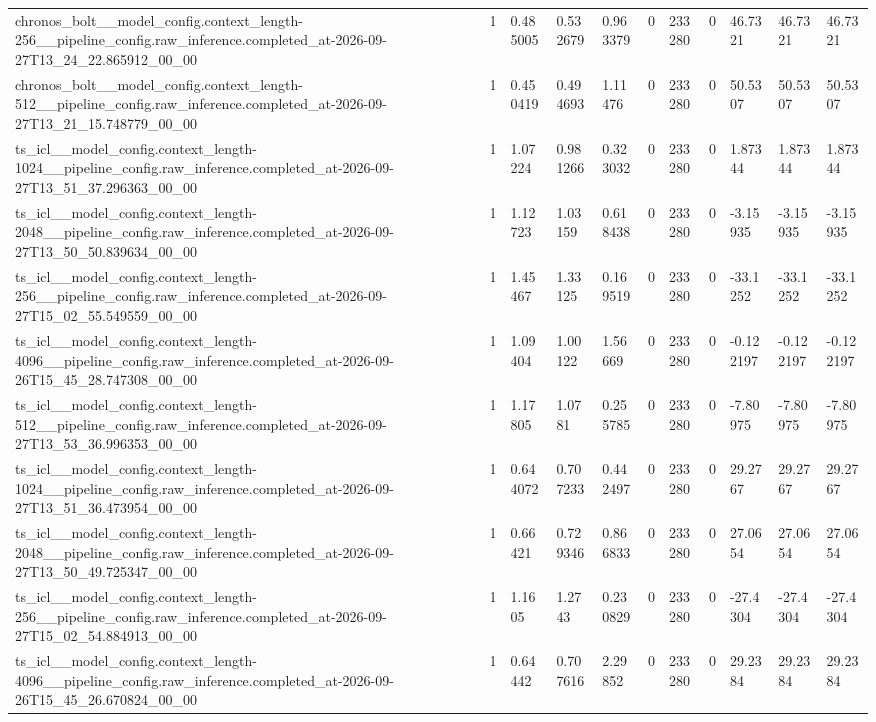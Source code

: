 \begin{tabular}{lllllllllll}
chronos\_bolt\_\_model\_config.context\_length-256\_\_pipeline\_config.raw\_inference.completed\_at-2026-09-27T13\_24\_22.865912\_00\_00 & 1 & 0.485005 & 0.532679 & 0.963379 & 0 & 233280 & 0 & 46.7321 & 46.7321 & 46.7321 \\
chronos\_bolt\_\_model\_config.context\_length-512\_\_pipeline\_config.raw\_inference.completed\_at-2026-09-27T13\_21\_15.748779\_00\_00 & 1 & 0.450419 & 0.494693 & 1.11476 & 0 & 233280 & 0 & 50.5307 & 50.5307 & 50.5307 \\
ts\_icl\_\_model\_config.context\_length-1024\_\_pipeline\_config.raw\_inference.completed\_at-2026-09-27T13\_51\_37.296363\_00\_00 & 1 & 1.07224 & 0.981266 & 0.323032 & 0 & 233280 & 0 & 1.87344 & 1.87344 & 1.87344 \\
ts\_icl\_\_model\_config.context\_length-2048\_\_pipeline\_config.raw\_inference.completed\_at-2026-09-27T13\_50\_50.839634\_00\_00 & 1 & 1.12723 & 1.03159 & 0.618438 & 0 & 233280 & 0 & -3.15935 & -3.15935 & -3.15935 \\
ts\_icl\_\_model\_config.context\_length-256\_\_pipeline\_config.raw\_inference.completed\_at-2026-09-27T15\_02\_55.549559\_00\_00 & 1 & 1.45467 & 1.33125 & 0.169519 & 0 & 233280 & 0 & -33.1252 & -33.1252 & -33.1252 \\
ts\_icl\_\_model\_config.context\_length-4096\_\_pipeline\_config.raw\_inference.completed\_at-2026-09-26T15\_45\_28.747308\_00\_00 & 1 & 1.09404 & 1.00122 & 1.56669 & 0 & 233280 & 0 & -0.122197 & -0.122197 & -0.122197 \\
ts\_icl\_\_model\_config.context\_length-512\_\_pipeline\_config.raw\_inference.completed\_at-2026-09-27T13\_53\_36.996353\_00\_00 & 1 & 1.17805 & 1.0781 & 0.255785 & 0 & 233280 & 0 & -7.80975 & -7.80975 & -7.80975 \\
ts\_icl\_\_model\_config.context\_length-1024\_\_pipeline\_config.raw\_inference.completed\_at-2026-09-27T13\_51\_36.473954\_00\_00 & 1 & 0.644072 & 0.707233 & 0.442497 & 0 & 233280 & 0 & 29.2767 & 29.2767 & 29.2767 \\
ts\_icl\_\_model\_config.context\_length-2048\_\_pipeline\_config.raw\_inference.completed\_at-2026-09-27T13\_50\_49.725347\_00\_00 & 1 & 0.66421 & 0.729346 & 0.866833 & 0 & 233280 & 0 & 27.0654 & 27.0654 & 27.0654 \\
ts\_icl\_\_model\_config.context\_length-256\_\_pipeline\_config.raw\_inference.completed\_at-2026-09-27T15\_02\_54.884913\_00\_00 & 1 & 1.1605 & 1.2743 & 0.230829 & 0 & 233280 & 0 & -27.4304 & -27.4304 & -27.4304 \\
ts\_icl\_\_model\_config.context\_length-4096\_\_pipeline\_config.raw\_inference.completed\_at-2026-09-26T15\_45\_26.670824\_00\_00 & 1 & 0.64442 & 0.707616 & 2.29852 & 0 & 233280 & 0 & 29.2384 & 29.2384 & 29.2384 \\

\end{tabular}
